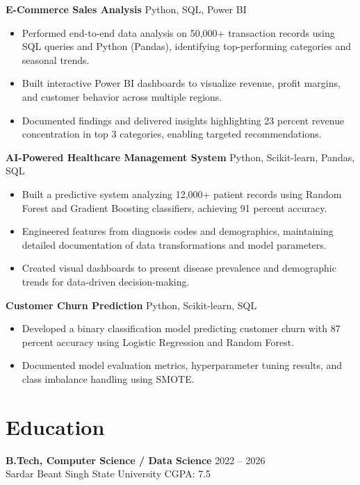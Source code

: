 \documentclass{article}
\begin{document}
\textbf{E-Commerce Sales Analysis} \hfill Python, SQL, Power BI
\begin{itemize}
    \item Performed end-to-end data analysis on 50,000+ transaction records using SQL queries and Python (Pandas), identifying top-performing categories and seasonal trends.
    \item Built interactive Power BI dashboards to visualize revenue, profit margins, and customer behavior across multiple regions.
    \item Documented findings and delivered insights highlighting 23 percent revenue concentration in top 3 categories, enabling targeted recommendations.
\end{itemize}

\vspace{2pt}

\textbf{AI-Powered Healthcare Management System} \hfill Python, Scikit-learn, Pandas, SQL
\begin{itemize}
    \item Built a predictive system analyzing 12,000+ patient records using Random Forest and Gradient Boosting classifiers, achieving 91 percent accuracy.
    \item Engineered features from diagnosis codes and demographics, maintaining detailed documentation of data transformations and model parameters.
    \item Created visual dashboards to present disease prevalence and demographic trends for data-driven decision-making.
\end{itemize}

\vspace{2pt}

\textbf{Customer Churn Prediction} \hfill Python, Scikit-learn, SQL
\begin{itemize}
    \item Developed a binary classification model predicting customer churn with 87 percent accuracy using Logistic Regression and Random Forest.
    \item Documented model evaluation metrics, hyperparameter tuning results, and class imbalance handling using SMOTE.
\end{itemize}

\vspace{4pt}

\section*{Education}
\textbf{B.Tech, Computer Science / Data Science} \hfill 2022 -- 2026 \\
Sardar Beant Singh State University \hfill CGPA: 7.5
\end{document}
